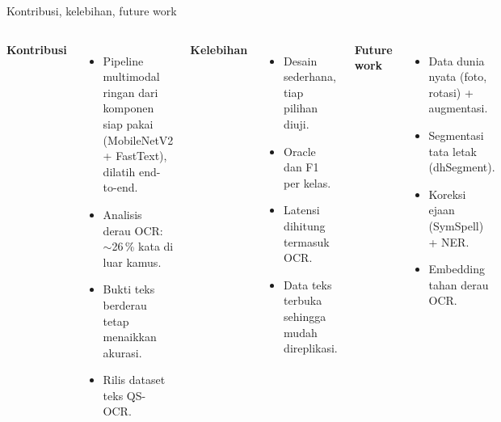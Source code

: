 \documentclass[aspectratio=169,10pt]{beamer}
\newcommand\kecil{\fontsize{8}{9.5}\selectfont}
\begin{document}
\begin{frame}{Kontribusi, kelebihan, future work}
  \begin{columns}[T]
    \textbf{Kontribusi}
    \begin{itemize}\kecil
      \item Pipeline multimodal ringan dari komponen siap pakai (MobileNetV2 + FastText), dilatih end-to-end.
      \item Analisis derau OCR: $\sim$26\,\% kata di luar kamus.
      \item Bukti teks berderau tetap menaikkan akurasi.
      \item Rilis dataset teks \alert{QS-OCR}.
    \end{itemize}
    \textbf{Kelebihan}
    \begin{itemize}\kecil
      \item Desain sederhana, tiap pilihan diuji.
      \item Oracle dan F1 per kelas.
      \item Latensi dihitung termasuk OCR.
      \item Data teks terbuka sehingga mudah direplikasi.
    \end{itemize}
    \textbf{Future work}
    \begin{itemize}\kecil
      \item Data dunia nyata (foto, rotasi) + augmentasi.
      \item Segmentasi tata letak (dhSegment).
      \item Koreksi ejaan (SymSpell) + NER.
      \item Embedding tahan derau OCR.
    \end{itemize}
  \end{columns}
\end{frame}
\end{document}
